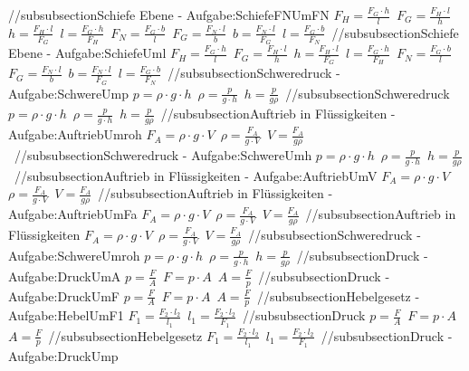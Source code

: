 //subsubsection{Schiefe Ebene - Aufgabe:SchiefeFNUmFN} 
$ F_{H}  = \frac{F_{G} \cdot h}{ l} $\ 
$ F_{G}  = \frac{F_{H} \cdot l}{ h} $\ 
$ h = \frac{F_{H} \cdot l}{ F_{G} } $\ 
$ l = \frac{F_{G} \cdot h}{ F_{H} } $\ 
$ F_{N}  = \frac{F_{G} \cdot b}{ l} $\ 
$ F_{G}  = \frac{F_{N} \cdot l}{ b} $\ 
$ b = \frac{F_{N} \cdot l}{ F_{G} } $\ 
$ l = \frac{F_{G} \cdot b}{ F_{N} } $\ 
//subsubsection{Schiefe Ebene - Aufgabe:SchiefeUml} 
$ F_{H}  = \frac{F_{G} \cdot h}{ l} $\ 
$ F_{G}  = \frac{F_{H} \cdot l}{ h} $\ 
$ h = \frac{F_{H} \cdot l}{ F_{G} } $\ 
$ l = \frac{F_{G} \cdot h}{ F_{H} } $\ 
$ F_{N}  = \frac{F_{G} \cdot b}{ l} $\ 
$ F_{G}  = \frac{F_{N} \cdot l}{ b} $\ 
$ b = \frac{F_{N} \cdot l}{ F_{G} } $\ 
$ l = \frac{F_{G} \cdot b}{ F_{N} } $\ 
//subsubsection{Schweredruck - Aufgabe:SchwereUmp} 
$ p =  \rho \cdot g\cdot h $\ 
$ \rho  = \frac{p}{g\cdot h} $\ 
$ h = \frac{p}{g \rho } $\ 
//subsubsection{Schweredruck} 
$ p =  \rho \cdot g\cdot h $\ 
$ \rho  = \frac{p}{g\cdot h} $\ 
$ h = \frac{p}{g \rho } $\ 
//subsubsection{Auftrieb in Flüssigkeiten - Aufgabe:AuftriebUmroh} 
$ F_{A}  =  \rho \cdot g\cdot V $\ 
$ \rho  = \frac{F_{A} }{g\cdot V} $\ 
$ V = \frac{F_{A} }{g \rho } $\ 
//subsubsection{Schweredruck - Aufgabe:SchwereUmh} 
$ p =  \rho \cdot g\cdot h $\ 
$ \rho  = \frac{p}{g\cdot h} $\ 
$ h = \frac{p}{g \rho } $\ 
//subsubsection{Auftrieb in Flüssigkeiten - Aufgabe:AuftriebUmV} 
$ F_{A}  =  \rho \cdot g\cdot V $\ 
$ \rho  = \frac{F_{A} }{g\cdot V} $\ 
$ V = \frac{F_{A} }{g \rho } $\ 
//subsubsection{Auftrieb in Flüssigkeiten - Aufgabe:AuftriebUmFa} 
$ F_{A}  =  \rho \cdot g\cdot V $\ 
$ \rho  = \frac{F_{A} }{g\cdot V} $\ 
$ V = \frac{F_{A} }{g \rho } $\ 
//subsubsection{Auftrieb in Flüssigkeiten} 
$ F_{A}  =  \rho \cdot g\cdot V $\ 
$ \rho  = \frac{F_{A} }{g\cdot V} $\ 
$ V = \frac{F_{A} }{g \rho } $\ 
//subsubsection{Schweredruck - Aufgabe:SchwereUmroh} 
$ p =  \rho \cdot g\cdot h $\ 
$ \rho  = \frac{p}{g\cdot h} $\ 
$ h = \frac{p}{g \rho } $\ 
//subsubsection{Druck - Aufgabe:DruckUmA} 
$ p = \frac{F}{A} $\ 
$ F = p\cdot A $\ 
$ A = \frac{F}{p} $\ 
//subsubsection{Druck - Aufgabe:DruckUmF} 
$ p = \frac{F}{A} $\ 
$ F = p\cdot A $\ 
$ A = \frac{F}{p} $\ 
//subsubsection{Hebelgesetz - Aufgabe:HebelUmF1} 
$ F_{1}  = \frac{F_{2} \cdot l_{2} }{ l_{1} } $\ 
$ l_{1}  = \frac{F_{2} \cdot l_{2} }{ F_{1} } $\ 
//subsubsection{Druck} 
$ p = \frac{F}{A} $\ 
$ F = p\cdot A $\ 
$ A = \frac{F}{p} $\ 
//subsubsection{Hebelgesetz} 
$ F_{1}  = \frac{F_{2} \cdot l_{2} }{ l_{1} } $\ 
$ l_{1}  = \frac{F_{2} \cdot l_{2} }{ F_{1} } $\ 
//subsubsection{Druck - Aufgabe:DruckUmp} 
